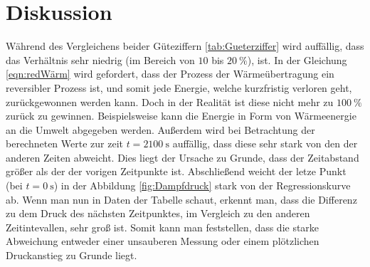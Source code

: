 \section{Diskussion}
\label{sec:Diskussion}
Während des Vergleichens beider Güteziffern \eqref{tab:Gueterziffer} wird auffällig, dass das Verhältnis sehr niedrig (im Bereich von $10$ bis $\SI{20}{\percent}$), ist.
In der Gleichung \eqref{eqn:redWärm} wird gefordert, dass der Prozess der Wärmeübertragung ein reversibler Prozess ist,
und somit jede Energie, welche kurzfristig verloren geht, zurückgewonnen werden kann. Doch in der Realität ist diese nicht mehr zu $\SI{100}{\percent}$
zurück zu gewinnen. Beispielsweise kann die Energie in Form von Wärmeenergie an die Umwelt abgegeben werden.
Außerdem wird bei Betrachtung der berechneten Werte zur zeit $t = \SI{2100}{\second}$ auffällig, dass diese sehr stark von den der anderen Zeiten abweicht. Dies liegt
der Ursache zu Grunde, dass der Zeitabstand größer als der der vorigen Zeitpunkte ist. Abschließend weicht der letze Punkt (bei $t = \SI{0}{\second}$)
in der Abbildung \eqref{fig:Dampfdruck} stark von der Regressionskurve ab. Wenn man nun in Daten der Tabelle schaut, erkennt man, dass die Differenz
zu dem Druck des nächsten Zeitpunktes, im Vergleich zu den anderen Zeitintevallen, sehr groß ist. Somit kann man feststellen, dass die starke Abweichung entweder
einer unsauberen Messung oder einem plötzlichen Druckanstieg zu Grunde liegt.
\newpage